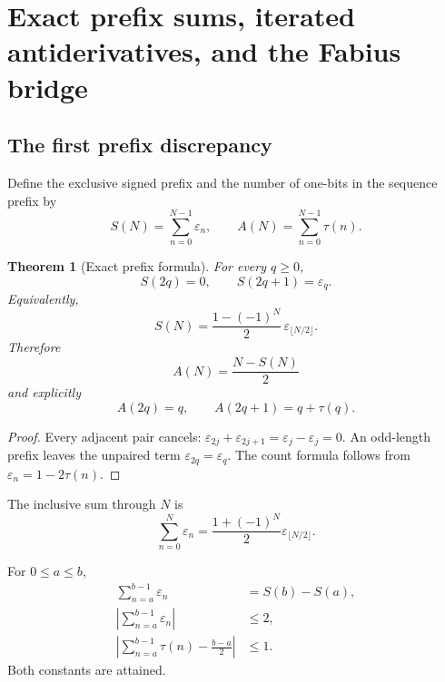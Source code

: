 \documentclass[11pt,oneside]{article}
\numberwithin{equation}{section}
\newtheorem{theorem}{Theorem}[section]
\theoremstyle{definition}
\theoremstyle{remark}
\newcommand{\eps}{\varepsilon}
\begin{document}
\section[Prefix sums and the Fabius bridge]{Exact prefix sums, iterated antiderivatives, and the Fabius bridge}
\label{p1:sec:prefix-fabius}

\subsection{The first prefix discrepancy}

Define the exclusive signed prefix and the number of one-bits in the sequence
prefix by
\begin{equation}
  S(N)=\sum_{n=0}^{N-1}\eps_n,
  \qquad
  A(N)=\sum_{n=0}^{N-1}\tau(n).
  \label{p1:eq:prefix-definitions}
\end{equation}

\begin{theorem}[Exact prefix formula]
\label{p1:thm:exact-prefix}
For every \(q\ge0\),
\begin{equation}
  \boxed{
  S(2q)=0,
  \qquad
  S(2q+1)=\eps_q.}
  \label{p1:eq:exact-prefix}
\end{equation}
Equivalently,
\begin{equation}
  S(N)=\frac{1-(-1)^N}{2}\,
       \eps_{\lfloor N/2\rfloor}.
  \label{p1:eq:compact-prefix}
\end{equation}
Therefore
\begin{equation}
  \boxed{
  A(N)=\frac{N-S(N)}2}
  \label{p1:eq:ones-prefix}
\end{equation}
and explicitly
\begin{equation}
  A(2q)=q,
  \qquad
  A(2q+1)=q+\tau(q).
  \label{p1:eq:ones-prefix-cases}
\end{equation}
\end{theorem}

\begin{proof}
Every adjacent pair cancels:
\(\eps_{2j}+\eps_{2j+1}=\eps_j-\eps_j=0\).  An odd-length prefix leaves the
unpaired term \(\eps_{2q}=\eps_q\).  The count formula follows from
\(\eps_n=1-2\tau(n)\).
\end{proof}

The inclusive sum through \(N\) is
\begin{equation}
  \sum_{n=0}^{N}\eps_n
  =\frac{1+(-1)^N}{2}\eps_{\lfloor N/2\rfloor}.
  \label{p1:eq:inclusive-prefix}
\end{equation}

\begin{corollary}
\label{p1:cor:interval-discrepancy}
For \(0\le a\le b\),
\begin{align}
  \sum_{n=a}^{b-1}\eps_n&=S(b)-S(a),
  \label{p1:eq:interval-exact}\\
  \left|\sum_{n=a}^{b-1}\eps_n\right|&\le2,
  \label{p1:eq:interval-signed-bound}\\
  \left|\sum_{n=a}^{b-1}\tau(n)-\frac{b-a}{2}\right|&\le1.
  \label{p1:eq:interval-bit-bound}
\end{align}
Both constants are attained.
\end{corollary}
\end{document}
